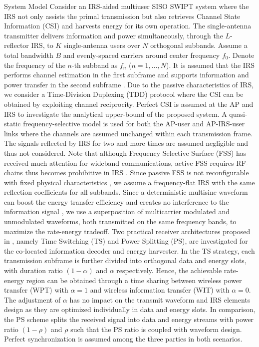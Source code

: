 \documentclass{IEEEtran}
\begin{document}
\begin{section}{System Model}
	Consider an IRS-aided multiuser SISO SWIPT system where the IRS not only assists the primal transmission but also retrieves Channel State Information (CSI) and harvests energy for its own operation. The single-antenna transmitter delivers information and power simultaneously, through the $L$-reflector IRS, to $K$ single-antenna users over $N$ orthogonal subbands. Assume a total bandwidth $B$ and evenly-spaced carriers around center frequency $f_0$. Denote the frequency of the $n$-th subband as $f_n$ ($n=1,\dots,N$). It is assumed that the IRS performs channel estimation in the first subframe and supports information and power transfer in the second subframe \cite{Zheng2019}. Due to the passive characteristics of IRS, we consider a Time-Division Duplexing (TDD) protocol where the CSI can be obtained by exploiting channel reciprocity. Perfect CSI is assumed at the AP and IRS to investigate the analytical upper-bound of the proposed system. A quasi-static frequency-selective model is used for both the AP-user and AP-IRS-user links where the channels are assumed unchanged within each transmission frame. The signals reflected by IRS for two and more times are assumed negligible and thus not considered. Note that although Frequency Selective Surface (FSS) has received much attention for wideband communications, active FSS requires RF-chains thus becomes prohibitive in IRS \cite{Kim2006,Xu2014}. Since passive FSS is not reconfigurable with fixed physical characteristics \cite{Anwar2018}, we assume a frequency-flat IRS with the same reflection coefficients for all subbands. Since a deterministic multisine waveform can boost the energy transfer efficiency \cite{Clerckx2016a} and creates no interference to the information signal \cite{Clerckx2018b}, we use a superposition of multicarrier modulated and unmodulated waveforms, both transmitted on the same frequency bands, to maximize the rate-energy tradeoff. Two practical receiver architectures proposed in \cite{Zhang2013}, namely Time Switching (TS) and Power Splitting (PS), are investigated for the co-located information decoder and energy harvester. In the TS strategy, each transmission subframe is further divided into orthogonal data and energy slots, with duration ratio $(1-\alpha)$ and $\alpha$ respectively. Hence, the achievable rate-energy region can be obtained through a time sharing between wireless power transfer (WPT) with $\alpha=1$ and wireless information transfer (WIT) with $\alpha=0$. The adjustment of $\alpha$ has no impact on the transmit waveform and IRS elements design as they are optimized individually in data and energy slots. In comparison, the PS scheme splits the received signal into data and energy streams with power ratio $(1-\rho)$ and $\rho$ such that the PS ratio is coupled with waveform design. Perfect synchronization is assumed among the three parties in both scenarios.


\end{section}
\end{document}

